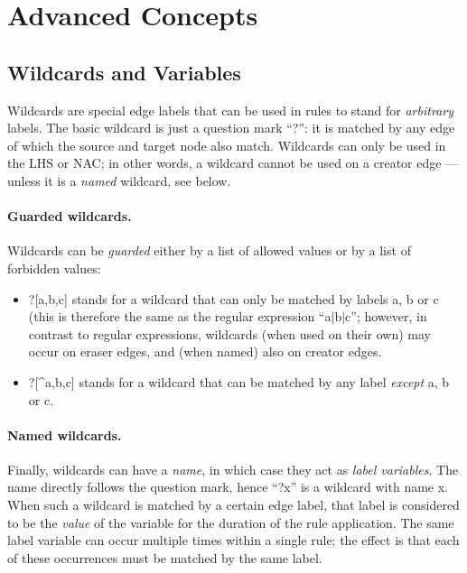 \section{Advanced Concepts}


\subsection{Wildcards and Variables}

Wildcards are special edge labels that can be used in rules to stand for
\emph{arbitrary} labels. The basic wildcard is just a question mark
``\textsf{?}'': it is matched by any edge of which the source and target node
also match. Wildcards can only be used in the LHS or NAC; in other words, a
wildcard cannot be used on a creator edge --- unless it is a \emph{named}
wildcard, see below.

\paragraph{Guarded wildcards.}

Wildcards can be \emph{guarded} either by a list of allowed values or by a list
of forbidden values:
\begin{itemize}\noitemsep
\item \textsf{?[a,b,c]} stands for a wildcard that can only be matched by
  labels \textsf{a}, \textsf{b} or \textsf{c} (this is therefore the same as
  the regular expression ``\textsf{a$|$b$|$c}''; however, in contrast to
  regular expressions, wildcards (when used on their own) may occur on eraser
  edges, and (when named) also on creator edges.

\item \textsf{?[\^{}a,b,c]} stands for a wildcard that can be matched by any
  label \emph{except} \textsf{a}, \textsf{b} or \textsf{c}.
\end{itemize}

\paragraph{Named wildcards.}

Finally, wildcards can have a \emph{name}, in which case they act as
\emph{label variables}. The name directly follows the question mark, hence
``\textsf{?x}'' is a wildcard with name \textsf{x}. When such a wildcard is
matched by a certain edge label, that label is considered to be the
\emph{value} of the variable for the duration of the rule application. The same
label variable can occur multiple times within a single rule; the effect is
that each of these occurrences must be matched by the same label.

